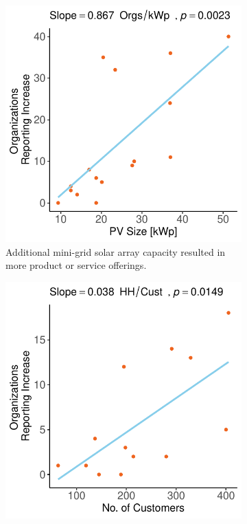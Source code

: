\begin{figure}[th]
	\centering
	\begin{subfigure}[t]{0.48\textwidth}
		\centering
		\includegraphics[width=\textwidth]{images/ci_offering_change_regression_community.pdf}
		\caption{Additional mini-grid solar array capacity resulted in more product or service offerings.}
		\label{fig:ci_offering}
	\end{subfigure}
	\hfill
	\begin{subfigure}[t]{0.48\textwidth}
		\centering
		\includegraphics[width=\textwidth]{images/workforce_change_regression_community.pdf}

\end{subfigure}
\end{figure}
